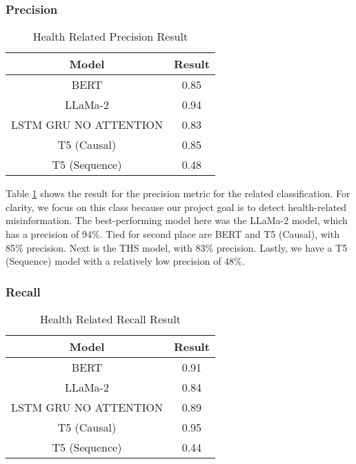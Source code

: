 \subsubsection{Precision}
\begin{table}[H]
	\centering
	\caption{Health Related Precision Result}
	\begin{tabular}{||c | c||} 
		\hline
		\textbf{Model} & \textbf{Result} \\ [0.5ex] 
		\hline
		BERT & 0.85  \\
		\hline
		LLaMa-2 & 0.94 \\ 
		\hline
		LSTM GRU NO ATTENTION & 0.83  \\
		\hline
		T5 (Causal) & 0.85 \\
		\hline
		T5 (Sequence) & 0.48 \\
		\hline
	\end{tabular}
	\label{table:HealthPrecision}
\end{table}

Table \ref{table:HealthPrecision} shows the result for the precision metric for the related classification. For clarity, we focus on this class because our project
goal is to detect health-related misinformation. The best-performing model here was the LLaMa-2 model, which has a precision of 94\%. Tied for second place
are BERT and T5 (Causal), with 85\% precision. Next is the THS model, with 83\% precision. Lastly, we have a T5 (Sequence) model with a relatively low
precision of 48\%.

\subsubsection{Recall}
\begin{table}[H]
	\centering
	\caption{Health Related Recall Result}
	\begin{tabular}{||c | c||} 
		\hline
		\textbf{Model} & \textbf{Result} \\ [0.5ex] 
		\hline
		BERT & 0.91  \\
		\hline
		LLaMa-2 & 0.84 \\ 
		\hline
		LSTM GRU NO ATTENTION & 0.89  \\
		\hline
		T5 (Causal) & 0.95 \\
		\hline
		T5 (Sequence) & 0.44 \\
		\hline
	\end{tabular}
	\label{table:HealthRecall}
\end{table}

